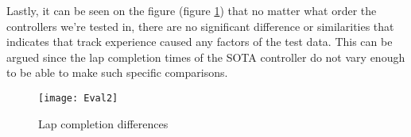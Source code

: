 Lastly, it can be seen on the figure (figure \ref{fig:timechart}) that no matter what order the controllers we’re tested in, there are no significant difference or similarities that indicates that track experience caused any factors of the test data. This can be argued since the lap completion times of the SOTA controller do not vary enough to be able to make such specific comparisons.


\begin{figure}[!htbp]
\centering
\texttt{[image: Eval2]}
\caption{Lap completion differences} \label{fig:timechart}
\end{figure}
